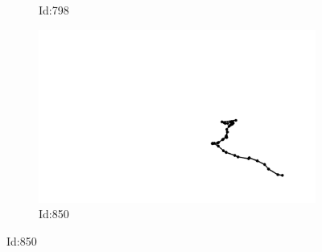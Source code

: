 \documentclass[12pt,twoside]{report}
\begin{document}
\begin{figure}
\begin{subfigure}[b]{0.20\textwidth}
\caption{Id:798}
\end{subfigure}
\begin{subfigure}[b]{0.20\textwidth}
\centering
\includegraphics[width=\textwidth]{../../trajectories/850.png}
\caption{Id:850}
\end{subfigure}
\end{figure}
\end{document}
